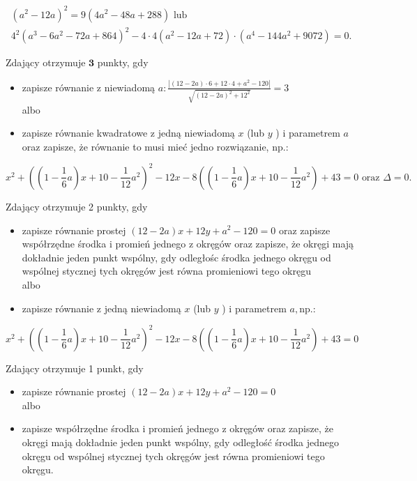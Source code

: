 \documentclass[10pt]{article}
\begin{document}
$$
\begin{gathered}
\left(a^{2}-12 a\right)^{2}=9\left(4 a^{2}-48 a+288\right) \text { lub } \\
4^{2}\left(a^{3}-6 a^{2}-72 a+864\right)^{2}-4 \cdot 4\left(a^{2}-12 a+72\right) \cdot\left(a^{4}-144 a^{2}+9072\right)=0 .
\end{gathered}
$$

Zdający otrzymuje $\mathbf{3}$ punkty, gdy

\begin{itemize}
  \item zapisze równanie z niewiadomą $a: \frac{\left|(12-2 a) \cdot 6+12 \cdot 4+a^{2}-120\right|}{\sqrt{(12-2 a)^{2}+12^{2}}}=3$\\
albo
  \item zapisze równanie kwadratowe z jedną niewiadomą $x$ (lub $y$ ) i parametrem $a$ oraz zapisze, że równanie to musi mieć jedno rozwiązanie, np.:
\end{itemize}

$$
x^{2}+\left(\left(1-\frac{1}{6} a\right) x+10-\frac{1}{12} a^{2}\right)^{2}-12 x-8\left(\left(1-\frac{1}{6} a\right) x+10-\frac{1}{12} a^{2}\right)+43=0 \text { oraz } \Delta=0 .
$$

Zdający otrzymuje 2 punkty, gdy

\begin{itemize}
  \item zapisze równanie prostej $(12-2 a) x+12 y+a^{2}-120=0$ oraz zapisze współrzędne środka i promień jednego z okręgów oraz zapisze, że okręgi mają dokładnie jeden punkt wspólny, gdy odległośc środka jednego okręgu od wspólnej stycznej tych okręgów jest równa promieniowi tego okręgu\\
albo
  \item zapisze równanie z jedną niewiadomą $x$ (lub $y$ ) i parametrem $a, \mathrm{np}$.:
\end{itemize}

$$
x^{2}+\left(\left(1-\frac{1}{6} a\right) x+10-\frac{1}{12} a^{2}\right)^{2}-12 x-8\left(\left(1-\frac{1}{6} a\right) x+10-\frac{1}{12} a^{2}\right)+43=0
$$

Zdający otrzymuje 1 punkt, gdy

\begin{itemize}
  \item zapisze równanie prostej $(12-2 a) x+12 y+a^{2}-120=0$\\
albo
  \item zapisze współrzędne środka i promień jednego z okręgów oraz zapisze, że okręgi mają dokładnie jeden punkt wspólny, gdy odległość środka jednego okręgu od wspólnej stycznej tych okręgów jest równa promieniowi tego okręgu.
\end{itemize}
\end{document}

